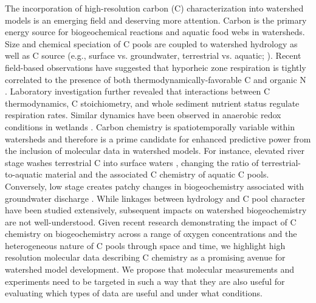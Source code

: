 \documentclass[preprint,review, 12pt]{elsarticle}
\begin{document}

The incorporation of high-resolution carbon (C) characterization into watershed models is an emerging field and deserving more attention. Carbon is the primary energy source for biogeochemical reactions and aquatic food webs in watersheds. Size and chemical speciation of C pools are coupled to watershed hydrology as well as C source (e.g., surface vs. groundwater, terrestrial vs. aquatic; \citealp{Stegen2016, Graham2017d, Maavara2017, Wohl2017, Graham2018, Stegen2018}). Recent field-based observations have suggested that hyporheic zone respiration is tightly correlated to the presence of both thermodynamically-favorable C \citep{Stegen2018} and organic N \citep{Graham2017d, Graham2018}. Laboratory investigation further revealed that interactions between C thermodynamics, C stoichiometry, and whole sediment nutrient status regulate respiration rates. Similar dynamics have been observed in anaerobic redox conditions in wetlands \citep{Boye2017, Boye2018}. Carbon chemistry is spatiotemporally variable within watersheds and therefore is a prime candidate for enhanced predictive power from the inclusion of molecular data in watershed models. For instance, elevated river stage washes terrestrial C into surface waters \citep{Golladay2000, Atkinson2009}, changing the ratio of terrestrial-to-aquatic material and the associated C chemistry of aquatic C pools. Conversely, low stage creates patchy changes in biogeochemistry associated with groundwater discharge \citep{Dent1999, Dahm2003}. While linkages between hydrology and C pool character have been studied extensively, subsequent impacts on watershed biogeochemistry are not well-understood. Given recent research demonstrating the impact of C chemistry on biogeochemistry across a range of oxygen concentrations and the heterogeneous nature of C pools through space and time, we highlight high resolution molecular data describing C chemistry as a promising avenue for watershed model development. We propose that molecular measurements and experiments need to be targeted in such a way that they are also useful for evaluating which types of data are useful and under what conditions.
\end{document}

